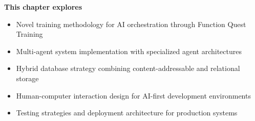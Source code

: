 \begin{tcolorbox}[
    enhanced,
    colback=white,
    colframe=brandPrimary!40,
    boxrule=1pt,
    arc=12pt,
    drop shadow={brandPrimary!20},
    left=1.5cm,
    right=1.5cm,
    top=1.2cm,
    bottom=1.2cm,
    before upper={\parindent0pt}
]
\begin{center}
{\Large\textbf{\textcolor{brandPrimary}{This chapter explores}}}
\end{center}

\vspace{0.8cm}

\begin{itemize}[leftmargin=1.2cm, itemsep=0.4cm, label={\textcolor{brandAccent}{$\triangleright$}}]
    \item {\large Novel training methodology for AI orchestration through Function Quest Training}
    \item {\large Multi-agent system implementation with specialized agent architectures}
    \item {\large Hybrid database strategy combining content-addressable and relational storage}
    \item {\large Human-computer interaction design for AI-first development environments}
    \item {\large Testing strategies and deployment architecture for production systems}
\end{itemize}
\end{tcolorbox}

\clearpage
